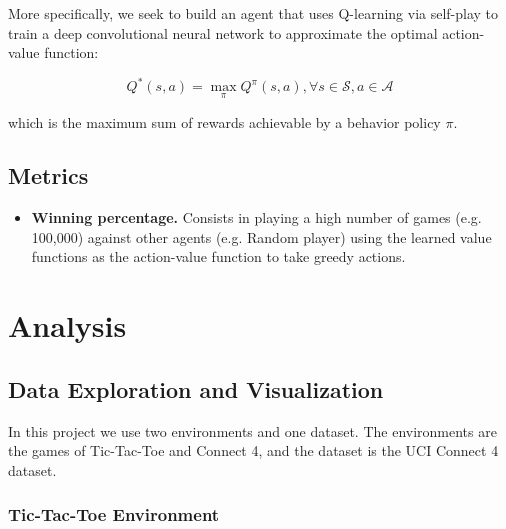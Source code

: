 \documentclass{article}
\begin{document}
More specifically, we seek to build an agent that uses Q-learning via self-play to train a deep
convolutional neural network to approximate the optimal action-value function:

\begin{equation}
Q^*(s,a) = \max\limits_\pi Q^\pi(s,a), \forall s \in \mathcal{S}, a \in \mathcal{A}
\end{equation}

\noindent which is the maximum sum of rewards achievable by a behavior policy $\pi$.

\subsection{Metrics}

\begin{itemize}

    \item \textbf{Winning percentage.} Consists in playing a high number of games (e.g. 100,000)
        against other agents (e.g. Random player) using the learned value functions as the
        action-value function to take greedy actions.
        
\end{itemize}

\section{Analysis}

\subsection{Data Exploration and Visualization}

In this project we use two environments and one dataset. The environments are the games of
Tic-Tac-Toe and Connect 4, and the dataset is the UCI Connect 4 dataset.

\subsubsection{Tic-Tac-Toe Environment}
\end{document}
